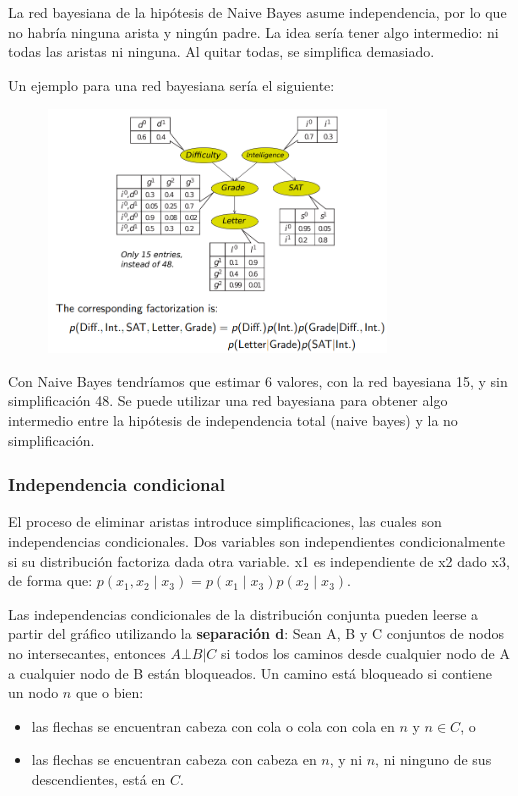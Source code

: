 La red bayesiana de la hipótesis de Naive Bayes asume independencia, por lo que no habría ninguna arista y ningún padre. La idea sería tener algo intermedio: ni todas las aristas ni ninguna. Al quitar todas, se simplifica demasiado.

Un ejemplo para una red bayesiana sería el siguiente:
\begin{figure}[h]
\centering
\includegraphics[width = 0.8\textwidth]{figs/bayesian-network-example.png}
\end{figure}

Con Naive Bayes tendríamos que estimar 6 valores, con la red bayesiana 15, y sin simplificación 48. Se puede utilizar una red bayesiana para obtener algo intermedio entre la hipótesis de independencia total (naive bayes) y la no simplificación.

\subsubsection{Independencia condicional}
El proceso de eliminar aristas introduce simplificaciones, las cuales son independencias condicionales. Dos variables son independientes condicionalmente si su distribución factoriza dada otra variable.
x1 es independiente de x2 dado x3, de forma que: $p(x_1, x_2 \mid x_3) = p(x_1\mid x_3) p(x_2 \mid x_3)$.

Las independencias condicionales de la distribución conjunta pueden leerse a partir del gráfico utilizando la \textbf{separación d}: Sean A, B y C conjuntos de nodos no intersecantes, entonces $A \bot B|C$ si todos los caminos desde cualquier nodo de A a cualquier nodo de B están bloqueados.
Un camino está bloqueado si contiene un nodo $n$ que o bien:
\begin{itemize}
\item las flechas se encuentran cabeza con cola o cola con cola en $n$ y $n \in C$, o
\item las flechas se encuentran cabeza con cabeza en $n$, y ni $n$, ni ninguno de sus descendientes, está en $C$.
\end{itemize}

